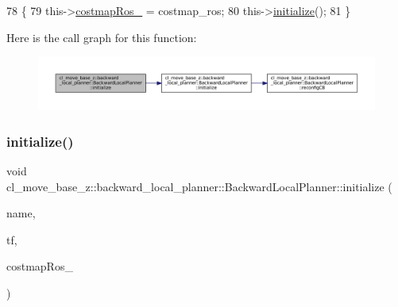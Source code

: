 \begin{DoxyCode}
78         \{
79             this->\hyperlink{classcl__move__base__z_1_1backward__local__planner_1_1BackwardLocalPlanner_a4136268882a105d9e06e173d85d5c0dc}{costmapRos\_} = costmap\_ros;
80             this->\hyperlink{classcl__move__base__z_1_1backward__local__planner_1_1BackwardLocalPlanner_a5c9815019cef272faed835cd8c575196}{initialize}();
81         \}
\end{DoxyCode}
Here is the call graph for this function\+:
\nopagebreak
\begin{figure}[H]
\begin{center}
\leavevmode
\includegraphics[width=350pt]{classcl__move__base__z_1_1backward__local__planner_1_1BackwardLocalPlanner_ae7659aa099ce5a329a9ef046dabcc599_cgraph}
\end{center}
\end{figure}
\mbox{\label{classcl__move__base__z_1_1backward__local__planner_1_1BackwardLocalPlanner_a9a854ad7d93c5db2efda316358aa845c}} 
\subsubsection{\texorpdfstring{initialize()}{initialize()}\hspace{0.1cm}{\footnotesize\ttfamily [2/3]}}
{\footnotesize\ttfamily void cl\+\_\+move\+\_\+base\+\_\+z\+::backward\+\_\+local\+\_\+planner\+::\+Backward\+Local\+Planner\+::initialize (\begin{DoxyParamCaption}\item[{std\+::string}]{name,  }\item[{tf2\+\_\+ros\+::\+Buffer $\ast$}]{tf,  }\item[{costmap\+\_\+2d\+::\+Costmap2\+D\+R\+OS $\ast$}]{costmap\+Ros\+\_\+ }\end{DoxyParamCaption})}




